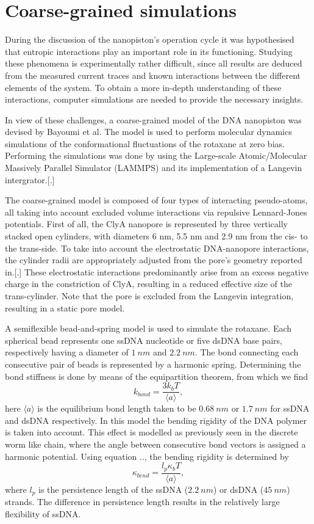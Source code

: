 \section{Coarse-grained simulations}

During the discussion of the nanopiston's operation cycle it was hypothesised
that entropic interactions play an important role in its functioning. Studying these
phenomena is experimentally rather difficult, since all results are deduced from the
measured current traces and known interactions between the different elements of the
system. To obtain a more in-depth understanding of these interactions, computer
simulations are needed to provide the necessary insights.

In view of these challenges, a coarse-grained model of the DNA nanopiston was devised by
Bayoumi et al. The model is used to perform molecular dynamics simulations of  the
conformational fluctuations of the rotaxane at zero bias. Performing the simulations was
done by using the Large-scale Atomic/Molecular Massively Parallel Simulator (LAMMPS) and
its implementation of a Langevin intergrator.[.]

The coarse-grained model is composed of four types of interacting pseudo-atoms, all
taking into account excluded volume interactions via repulsive Lennard-Jones
potentials. First of all, the ClyA nanopore is represented by three vertically stacked
open cylinders, with diameters 6 nm, 5.5 nm and 2.9 nm from the cis- to the trans-side.
To take into account the electrostatic DNA-nanopore interactions, the cylinder radii
are appropriately adjusted from the pore's geometry reported in.[.]
These electrostatic interactions predominantly arise from an excess negative charge in
the constriction of ClyA, resulting in a reduced effective size of the trans-cylinder.
Note that the pore is excluded from the Langevin integration, resulting in a static pore
model.

A semiflexible bead-and-spring model is used to simulate the rotaxane. Each spherical
bead represents one ssDNA nucleotide or five dsDNA base pairs, respectively having a
diameter of $1\ nm$ and  $2.2\ nm$. The bond connecting each consecutive pair of beads is
represented by a harmonic spring. Determining the bond stiffness is done by means of the
equipartition theorem, from which we find
  \begin{equation}
    k_{bond} = \frac{3 k_b T }{ \langle a \rangle},
  \end{equation}
here $\langle a \rangle$ is the equilibrium bond length taken to be $0.68\ nm$ or $1.7\
nm$ for ssDNA and dsDNA respectively. In this model the bending rigidity of the DNA
polymer is taken into account. This effect is modelled as previously seen in the discrete
worm like chain, where the angle between consecutive bond vectors is assigned a harmonic
potential. Using equation .., the bending rigidity is determined by
  \begin{equation}
    \kappa_{bend} = \frac{l_{p} \kappa_b T}{\langle a \rangle},
  \end{equation}
  where $l_p$ is the persistence length of the ssDNA ($2.2\ nm$) or dsDNA ($45\ nm$)
strands. The difference in persistence length results in the relatively large flexibility
of ssDNA.


